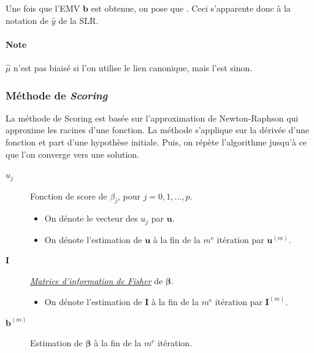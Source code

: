 \documentclass[french]{article}
\begin{document}
\begin{multicols*}{2}
Une fois que l'EMV $\bm{b}$ est obtenue, on pose que . Ceci s'apparente donc à la notation de $\hat{y}$ de la SLR. 

\paragraph{Note}	$\hat{\mu}$ n'est pas biaisé si l'on utilise le lien canonique, mais l'est sinon.


\subsubsection{Méthode de \og \textit{Scoring} \fg{}}\label{subsubsec:ScoreMethod}
\begin{rappel_enhanced}[Contexte]
La méthode de Scoring est basée sur l'approximation de Newton-Raphson qui approxime les racines d'une fonction. La méthode s'applique sur la dérivée d'une fonction et part d'une hypothèse initiale. Puis, on répète l'algorithme jusqu'à ce que l'on converge vers une solution.
\end{rappel_enhanced}

\begin{distributions}[Notation]
\begin{description}
	\item[$u_{j}$]	Fonction de score de $\beta_{j}$,  pour $j = 0, 1, \dots, p$.
		\begin{itemize}
		\item	On dénote le vecteur des $u_{j}$ par $\bm{u}$.
		\item	On dénote l'estimation de $\bm{u}$ à la fin de la $m^{\text{e}}$ itération par $\bm{u}^{(m)}$.
		\end{itemize}
	\item[$\bm{I}$]	\textit{\color{bleudefrance}\underline{\hyperlink{FisherInfoDef}{\color{bleudefrance} Matrice d'information de Fisher}}} de $\bm{\beta}$.
		\begin{itemize}
		\item	On dénote l'estimation de $\bm{I}$ à la fin de la $m^{\text{e}}$ itération par $\bm{I}^{(m)}$.
		\end{itemize}
	\item[$\bm{b}^{(m)}$]	Estimation de $\bm{\beta}$ à la fin de la $m^{\text{e}}$ itération.
\end{description}
\end{distributions}


\end{multicols*}
\end{document}
